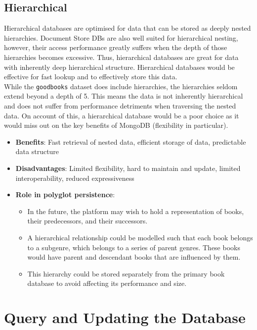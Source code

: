 \documentclass[11pt]{article}
\begin{document}
\subsection{Hierarchical}
\label{sec:org6b8e6d7}
Hierarchical databases are optimised for data that can be stored as deeply nested hierarchies. Document Store DBs are also well suited for hierarchical nesting, however, their access performance greatly suffers when the depth of those hierarchies becomes excessive. Thus, hierarchical databases are great for data with inherently deep hierarchical structure. Hierarchical databases would be effective for fast lookup and to effectively store this data.\\
\linebreak
While the \texttt{goodbooks} dataset does include hierarchies, the hierarchies seldom extend beyond a depth of 5. This means the data is not inherently hierarchical and does not suffer from performance detriments when traversing the nested data. On account of this, a hierarchical database would be a poor choice as it would miss out on the key benefits of MongoDB (flexibility in particular).

\begin{itemize}
\item \textbf{Benefits}: Fast retrieval of nested data, efficient storage of data, predictable data structure
\item \textbf{Disadvantages}: Limited flexibility, hard to maintain and update, limited interoperability, reduced expressiveness
\item \textbf{Role in polyglot persistence}:
\begin{itemize}
\item In the future, the platform may wish to hold a representation of books, their predecessors, and their successors.
\item A hierarchical relationship could be modelled such that each book belongs to a subgenre, which belongs to a series of parent genres. These books would have parent and descendant books that are influenced by them.
\item This hierarchy could be stored separately from the primary book database to avoid affecting its performance and size.
\end{itemize}
\end{itemize}
\section{Query and Updating the Database}
\label{sec:org965f929}
\end{document}
